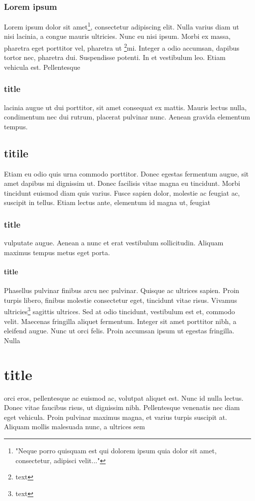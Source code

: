 \documentclass[13pt]{article}
\begin{document}
\subsubsection{Lorem ipsum}
\normalsize Lorem ipsum dolor sit amet\thanks{"Neque porro quisquam est qui dolorem ipsum quia dolor sit amet, consectetur, adipisci velit..."}, consectetur adipiscing elit. Nulla varius diam ut nisi lacinia, a congue mauris ultricies. Nunc eu nisi ipsum. Morbi ex massa, pharetra eget porttitor vel, pharetra ut \footnote{text }mi. Integer a odio accumsan, dapibus tortor nec, pharetra dui. Suspendisse potenti. In et vestibulum leo. Etiam vehicula est.
Pellentesque
\subsubsection[short title]{title}
 lacinia augue ut dui porttitor, sit amet consequat ex mattis. Mauris lectus nulla, condimentum nec dui rutrum, placerat pulvinar nunc. Aenean gravida elementum tempus.
 \subsection{titile} Etiam eu odio quis urna commodo porttitor. Donec egestas fermentum augue, sit amet dapibus mi dignissim ut. Donec facilisis vitae magna eu tincidunt. Morbi tincidunt euismod diam quis varius. Fusce sapien dolor, molestie ac feugiat ac, suscipit in tellus. Etiam lectus ante, elementum id magna ut, feugiat 
 \subsubsection{title}
 vulputate augue. Aenean a nunc et erat vestibulum sollicitudin. Aliquam maximus tempus metus eget porta.
\twocolumn[null]
\paragraph{title}
\normalsize Phasellus pulvinar finibus arcu nec pulvinar. Quisque ac ultrices sapien. Proin turpis libero, finibus molestie consectetur eget, tincidunt vitae risus. Vivamus ultricies\footnote{text} sagittis ultrices. Sed at odio tincidunt, vestibulum est et, commodo velit. Maecenas fringilla aliquet fermentum. Integer sit amet porttitor nibh, a eleifend augue. Nunc ut orci felis. Proin accumsan ipsum ut egestas fringilla. Nulla \section{title}
orci eros, pellentesque ac euismod ac, volutpat aliquet est. Nunc id nulla lectus. Donec vitae faucibus risus, ut dignissim nibh. Pellentesque venenatis nec diam eget vehicula. Proin pulvinar maximus magna, et varius turpis suscipit at. Aliquam mollis malesuada nunc, a ultrices sem 
\end{document}
